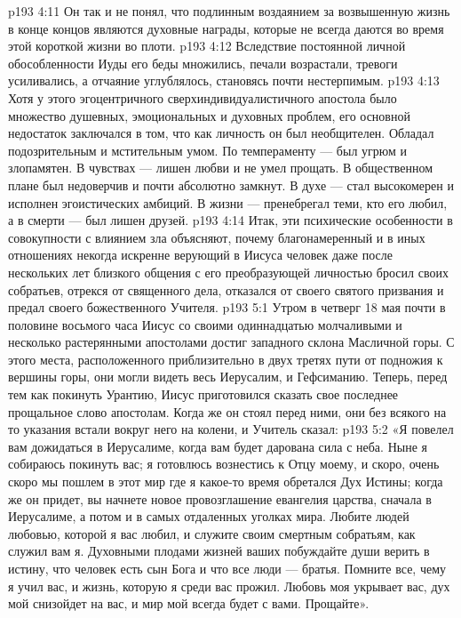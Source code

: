 \vs p193 4:11 \pc {}\bibnobreakspace Он так и не понял, что подлинным воздаянием за возвышенную жизнь в конце концов являются духовные награды, которые не всегда даются во время этой короткой жизни во плоти.
\vs p193 4:12 \pc Вследствие постоянной личной обособленности Иуды его беды множились, печали возрастали, тревоги усиливались, а отчаяние углублялось, становясь почти нестерпимым.
\vs p193 4:13 Хотя у этого эгоцентричного сверхиндивидуалистичного апостола было множество душевных, эмоциональных и духовных проблем, его основной недостаток заключался в том, что как личность он был необщителен. Обладал подозрительным и мстительным умом. По темпераменту --- был угрюм и злопамятен. В чувствах --- лишен любви и не умел прощать. В общественном плане был недоверчив и почти абсолютно замкнут. В духе --- стал высокомерен и исполнен эгоистических амбиций. В жизни --- пренебрегал теми, кто его любил, а в смерти --- был лишен друзей.
\vs p193 4:14 Итак, эти психические особенности в совокупности с влиянием зла объясняют, почему благонамеренный и в иных отношениях некогда искренне верующий в Иисуса человек даже после нескольких лет близкого общения с его преобразующей личностью бросил своих собратьев, отрекся от священного дела, отказался от своего святого призвания и предал своего божественного Учителя.
\vs p193 5:1 Утром в четверг 18 мая почти в половине восьмого часа Иисус со своими одиннадцатью молчаливыми и несколько растерянными апостолами достиг западного склона Масличной горы. С этого места, расположенного приблизительно в двух третях пути от подножия к вершины горы, они могли видеть весь Иерусалим, и Гефсиманию. Теперь, перед тем как покинуть Урантию, Иисус приготовился сказать свое последнее прощальное слово апостолам. Когда же он стоял перед ними, они без всякого на то указания встали вокруг него на колени, и Учитель сказал:
\vs p193 5:2 \pc «Я повелел вам дожидаться в Иерусалиме, когда вам будет дарована сила с неба. Ныне я собираюсь покинуть вас; я готовлюсь вознестись к Отцу моему, и скоро, очень скоро мы пошлем в этот мир где я какое\hyp{}то время обретался Дух Истины; когда же он придет, вы начнете новое провозглашение евангелия царства, сначала в Иерусалиме, а потом и в самых отдаленных уголках мира. Любите людей любовью, которой я вас любил, и служите своим смертным собратьям, как служил вам я. Духовными плодами жизней ваших побуждайте души верить в истину, что человек есть сын Бога и что все люди --- братья. Помните все, чему я учил вас, и жизнь, которую я среди вас прожил. Любовь моя укрывает вас, дух мой снизойдет на вас, и мир мой всегда будет с вами. Прощайте».
